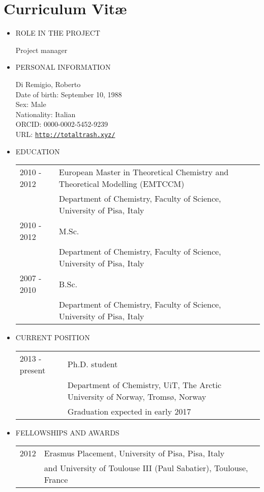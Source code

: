 \documentclass[notitlepage,a4paper,12pt]{article}
\begin{document}
\section*{Curriculum Vit\ae}\label{sec:curriculum-vitae}

\begin{itemize}
\item ROLE IN THE PROJECT

Project manager

\item PERSONAL INFORMATION

Di Remigio, Roberto \\
Date of birth: September 10, 1988 \\
Sex: Male \\
Nationality: Italian \\
ORCID: 0000-0002-5452-9239 \\
URL: \href{http://totaltrash.xyz/}{\texttt{http://totaltrash.xyz/}}

\item EDUCATION

  \begin{tabular}{ll}
2010 - 2012 & European Master in Theoretical Chemistry and Theoretical Modelling (EMTCCM) \\
    & Department of Chemistry, Faculty of Science, University of Pisa, Italy\\
2010 - 2012 & M.Sc. \\
    & Department of Chemistry, Faculty of Science, University of Pisa, Italy\\
2007 - 2010 & B.Sc. \\
    & Department of Chemistry, Faculty of Science, University of Pisa, Italy\\
  \end{tabular}

\item CURRENT POSITION

  \begin{tabular}{ll}
2013 - present & Ph.D. student \\
    & Department of Chemistry, UiT, The Arctic University of Norway, Tromsø, Norway \\
    & Graduation expected in early 2017
  \end{tabular}

\item FELLOWSHIPS AND AWARDS

  \begin{tabular}{ll}
 2012 & Erasmus Placement, University of Pisa, Pisa, Italy  \\
      & and University of Toulouse III (Paul Sabatier), Toulouse, France \\
  \end{tabular}


\end{itemize}
\end{document}
